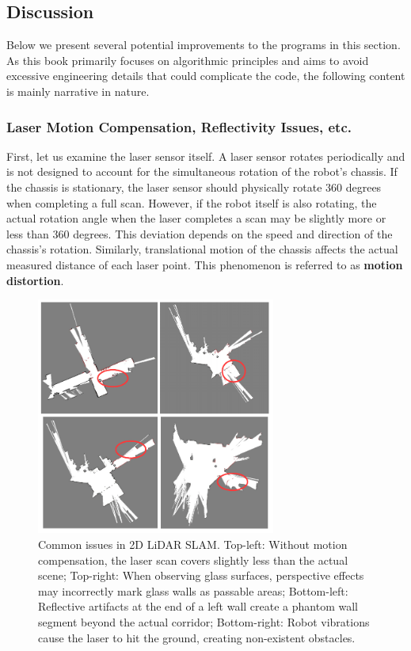 \subsection{Discussion}  
Below we present several potential improvements to the programs in this section. As this book primarily focuses on algorithmic principles and aims to avoid excessive engineering details that could complicate the code, the following content is mainly narrative in nature.

\subsubsection{Laser Motion Compensation, Reflectivity Issues, etc.}  
First, let us examine the laser sensor itself. A laser sensor rotates periodically and is not designed to account for the simultaneous rotation of the robot's chassis. If the chassis is stationary, the laser sensor should physically rotate 360 degrees when completing a full scan. However, if the robot itself is also rotating, the actual rotation angle when the laser completes a scan may be slightly more or less than 360 degrees. This deviation depends on the speed and direction of the chassis's rotation. Similarly, translational motion of the chassis affects the actual measured distance of each laser point. This phenomenon is referred to as \textbf{motion distortion}.

\begin{figure}[!t]
	\centering
	\includegraphics[width=0.7\textwidth]{resources/2d-lidar-mapping/lidar-problems.pdf}
	\caption{Common issues in 2D LiDAR SLAM. Top-left: Without motion compensation, the laser scan covers slightly less than the actual scene; Top-right: When observing glass surfaces, perspective effects may incorrectly mark glass walls as passable areas; Bottom-left: Reflective artifacts at the end of a left wall create a phantom wall segment beyond the actual corridor; Bottom-right: Robot vibrations cause the laser to hit the ground, creating non-existent obstacles.}
	\label{fig:lidar-problems}
\end{figure}

